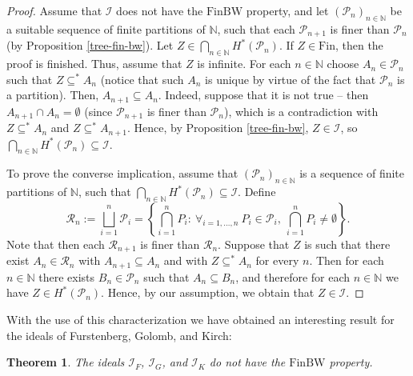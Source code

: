 \documentclass{amsart}
\newtheorem{thm}{Theorem}[section]
\theoremstyle{definition}
\newcommand{\N}{{\mathbb N}}
\newcommand{\Fin}{\textrm{Fin}}
\newcommand{\I}{\mathcal I}
\newcommand{\finbw}{\text{FinBW}}
\begin{document}
\begin{proof}
Assume that $\I$ does not have the $\finbw$ property, and let $(\mathcal{P}_n)_{n\in\N}$ be a suitable sequence of finite partitions of $\N$, such that each $\mathcal{P}_{n+1}$ is finer than $\mathcal{P}_n$ (by Proposition \ref{tree-fin-bw}). Let $Z \in \bigcap_{n\in\N}{H^{*}(\mathcal{P}_n)}$. If $Z\in\Fin$, then the proof is finished. Thus, assume that $Z$ is infinite. For each $n\in\N$ choose $A_n\in \mathcal{P}_n$ such that $Z \subseteq^* A_n$ (notice that such $A_n$ is unique by virtue of the fact that $\mathcal{P}_n$ is a partition). Then, $A_{n+1} \subseteq A_n$. Indeed, suppose that it is not true -- then $A_{n+1} \cap A_n = \emptyset$ (since $\mathcal{P}_{n+1}$ is finer than $\mathcal{P}_n$), which is a contradiction with $Z \subseteq^* A_n$ and $Z \subseteq^* A_{n+1}$. Hence, by Proposition \ref{tree-fin-bw}, $Z\in\I$, so $\bigcap_{n\in\N}{H^{*}(\mathcal{P}_n)} \subseteq \I$.

To prove the converse implication, assume that $(\mathcal{P}_n)_{n\in\N}$ is a sequence of finite partitions of $\N$, such that $\bigcap_{n\in\N}{H^{*}(\mathcal{P}_n)} \subseteq \I$. Define 
$$\mathcal{R}_n := \bigsqcup_{i=1}^{n}{\mathcal{P}_i} = \left\{\bigcap_{i=1}^{n}{P_i} :\ \forall_{i=1,\ldots,n}\ P_i\in\mathcal{P}_i,\ \bigcap_{i=1}^{n}{P_i}\neq\emptyset\right\}.$$
Note that then each $\mathcal{R}_{n+1}$ is finer than $\mathcal{R}_n$.
Suppose that $Z$ is such that there exist $A_n \in \mathcal{R}_n$ with $A_{n+1} \subseteq A_n$ and with $Z \subseteq^* A_n$ for every $n$. Then for each $n\in\N$ there exists $B_n \in \mathcal{P}_n$ such that $A_n \subseteq B_n$, and therefore for each $n\in\N$ we have $Z \in H^{*}(\mathcal{P}_n)$. Hence, by our assumption, we obtain that $Z\in\I$.
\end{proof}

With the use of this characterization we have obtained an interesting result for the ideals of Furstenberg, Golomb, and Kirch:

\begin{thm}
The ideals $\I_F$, $\I_G$, and $\I_K$ do not have the $\finbw$ property.
\end{thm}
\end{document}
